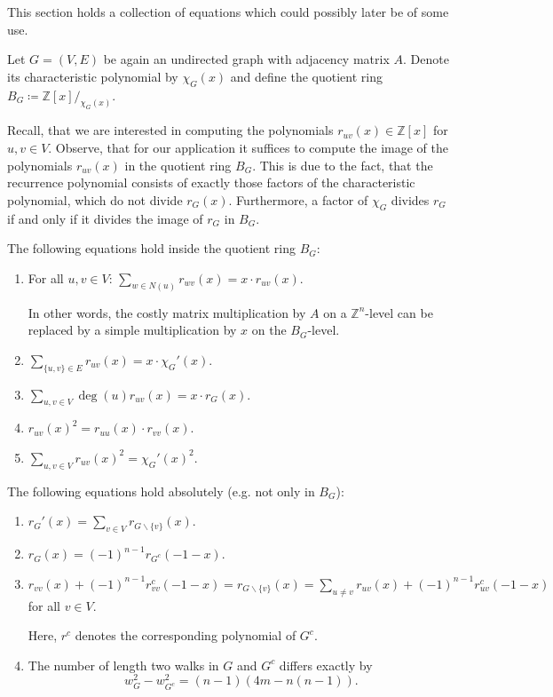 \documentclass[a4paper,12pt]{article}
\begin{document}
This section holds a collection of equations which could possibly later be of some use.

Let $G = (V,E)$ be again an undirected graph with adjacency matrix $A$. Denote its characteristic polynomial by $\chi_G(x)$ and define the quotient ring $B_G \coloneqq \mathbb{Z}[x]/_{\chi_G(x)}$.

Recall, that we are interested in computing the polynomials $r_{uv}(x) \in \mathbb{Z}[x]$ for $u,v\in V$. Observe, that for our application it suffices to compute the image of the polynomials $r_{uv}(x)$ in the quotient ring $B_G$. This is due to the fact, that the recurrence polynomial consists of exactly those factors of the characteristic polynomial, which do not divide $r_G(x)$. Furthermore, a factor of $\chi_G$ divides $r_G$ if and only if it divides the image of $r_G$ in $B_G$.

The following equations hold inside the quotient ring $B_G$:

\begin{enumerate}
\item
For all $u,v \in V$: $\sum_{w\in N(u)}r_{wv}(x) = x \cdot r_{uv}(x)$.

In other words, the costly matrix multiplication by $A$ on a $\mathbb{Z}^n$-level can be replaced by a simple multiplication by $x$ on the $B_G$-level.

\item $\sum_{\{u,v\} \in E}r_{uv}(x) = x \cdot \chi_G'(x)$.

\item $\sum_{u,v \in V}\deg(u)r_{uv}(x) = x \cdot r_G(x)$.

\item $r_{uv}(x)^2 = r_{uu}(x) \cdot r_{vv}(x)$.

\item $\sum_{u,v\in V}r_{uv}(x)^2 = \chi_G'(x)^2$.
\end{enumerate}
The following equations hold absolutely (e.g. not only in $B_G$):
\begin{enumerate}
\item $r_G'(x) = \sum_{v\in V} r_{G \backslash \{v\}}(x)$.

\item $r_G(x) = (-1)^{n-1}r_{G^c}(-1-x)$.

\item $r_{vv}(x) + (-1)^{n-1}r_{vv}^c(-1-x) = r_{G \backslash \{v\}}(x) = \sum_{u \neq v} r_{uv}(x) + (-1)^{n-1}r_{uv}^c(-1-x)$ for all $v\in V$.

Here, $r^c$ denotes the corresponding polynomial of $G^c$.

\item The number of length two walks in $G$ and $G^c$ differs exactly by $$w_G^2 - w_{G^c}^2 = (n-1)(4m-n(n-1)).$$
\end{enumerate}


\end{document}
